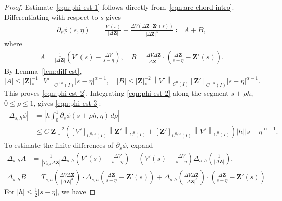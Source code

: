 \documentclass[11pt,reqno]{amsart}
\theoremstyle{plain}
\theoremstyle{definition}
\numberwithin{equation}{section}
\newcommand{\paren}[1]{\left(#1\right)}
\newcommand{\p}{\partial}
\newcommand{\bm}[1]{\boldsymbol{#1}}
\newcommand{\abs}[1]{\left\lvert #1 \right\rvert}
\newcommand{\norm}[1]{\left\lVert #1 \right\rVert}
\newcommand{\ci}[1]{C^{#1}(I)}
\begin{document}
\begin{proof}
Estimate~\eqref{eqn:phi-est-1} follows directly from~\eqref{eqn:arc-chord-intro}. Differentiating with respect to $s$ gives
\begin{align}
    \p_s\phi(s,\eta) &= \frac{V'(s)}{\abs{\Delta\bm Z}} - \frac{\Delta V\paren{\Delta \bm Z\cdot\bm Z'(s)}}{\abs{\Delta\bm Z}^3} \coloneqq A + B,
\end{align}
where
\begin{align}
    A  = \frac{1}{\abs{\Delta\bm Z}} \paren{V'(s) - \frac{\Delta V}{s-\eta}} ,\quad
    B = \frac{ \Delta V\Delta\bm Z}{\abs{\Delta\bm Z}^3} \cdot\paren{\frac{\Delta \bm Z}{s-\eta} - \bm Z'(s)}.
\end{align}
By Lemma~\ref{lem:diff-est},
\begin{equation}
    \abs{A} \le \abs{\bm Z}_*^{-1}[V']_{\ci{0,\alpha}} \abs{s-\eta}^{\alpha-1},\quad \abs{B} \le \abs{\bm Z}_*^{-2}\norm{V'}_{\ci{0}} [\bm Z']_{\ci{0,\alpha}} \abs{s-\eta}^{\alpha-1}.
\end{equation}
This proves \eqref{eqn:phi-est-2}. Integrating
\eqref{eqn:phi-est-2} along the segment $s+\rho h$, $0\le\rho\le1$,
gives \eqref{eqn:phi-est-3}:
\begin{equation}
\begin{aligned}
    \abs{\Delta_{s,h}\phi} &= \abs{ h\int_0^1 \p_s \phi(s+\rho h, \eta)\,d\rho }  \\
    &\le C \abs{\bm Z}_*^{-2}\paren{[V']_{\ci{0,\alpha}}\norm{\bm Z'}_{\ci{0}} + [\bm
    Z']_{\ci{0,\alpha}}\norm{V'}_{\ci{0}}} \abs{h} \abs{s-\eta}^{\alpha-1} .
\end{aligned}
\end{equation}
To estimate the finite differences of $\p_s\phi$, expand
\begin{align}
    \Delta_{s,h} A &= \frac{1}{\abs{T_{s,h}\Delta\bm Z}} \Delta_{s,h}\paren{V'(s) - \frac{\Delta V}{s-\eta}} + \paren{V'(s) - \frac{\Delta V}{s-\eta}}\Delta_{s,h}\paren{\frac{1}{\abs{\Delta\bm Z}} },\\
    \Delta_{s,h} B &= T_{s,h}\paren{\frac{ \Delta V\Delta\bm Z}{\abs{\Delta\bm Z}^3}} \cdot\Delta_{s,h}\paren{\frac{\Delta \bm Z}{s-\eta} - \bm Z'(s)} + \Delta_{s,h}\paren{\frac{ \Delta V\Delta\bm Z}{\abs{\Delta\bm Z}^3}} \cdot \paren{\frac{\Delta \bm Z}{s-\eta} - \bm Z'(s)}
\end{align}
For $\abs{h} \le \frac{1}{2}\abs{s-\eta}$, we have

\end{proof}
\end{document}
